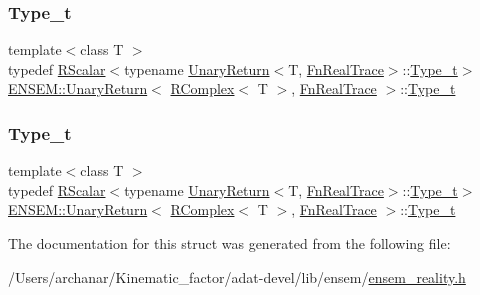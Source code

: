 \subsubsection{\texorpdfstring{Type\_t}{Type\_t}\hspace{0.1cm}{\footnotesize\ttfamily [2/3]}}
{\footnotesize\ttfamily template$<$class T $>$ \\
typedef \mbox{\hyperlink{classENSEM_1_1RScalar}{R\+Scalar}}$<$typename \mbox{\hyperlink{structENSEM_1_1UnaryReturn}{Unary\+Return}}$<$T, \mbox{\hyperlink{structENSEM_1_1FnRealTrace}{Fn\+Real\+Trace}}$>$\+::\mbox{\hyperlink{structENSEM_1_1UnaryReturn_3_01RComplex_3_01T_01_4_00_01FnRealTrace_01_4_abd4db6ffb0c49832943fdeb34185ec21}{Type\+\_\+t}}$>$ \mbox{\hyperlink{structENSEM_1_1UnaryReturn}{E\+N\+S\+E\+M\+::\+Unary\+Return}}$<$ \mbox{\hyperlink{classENSEM_1_1RComplex}{R\+Complex}}$<$ T $>$, \mbox{\hyperlink{structENSEM_1_1FnRealTrace}{Fn\+Real\+Trace}} $>$\+::\mbox{\hyperlink{structENSEM_1_1UnaryReturn_3_01RComplex_3_01T_01_4_00_01FnRealTrace_01_4_abd4db6ffb0c49832943fdeb34185ec21}{Type\+\_\+t}}}

\mbox{\label{structENSEM_1_1UnaryReturn_3_01RComplex_3_01T_01_4_00_01FnRealTrace_01_4_abd4db6ffb0c49832943fdeb34185ec21}} 
\subsubsection{\texorpdfstring{Type\_t}{Type\_t}\hspace{0.1cm}{\footnotesize\ttfamily [3/3]}}
{\footnotesize\ttfamily template$<$class T $>$ \\
typedef \mbox{\hyperlink{classENSEM_1_1RScalar}{R\+Scalar}}$<$typename \mbox{\hyperlink{structENSEM_1_1UnaryReturn}{Unary\+Return}}$<$T, \mbox{\hyperlink{structENSEM_1_1FnRealTrace}{Fn\+Real\+Trace}}$>$\+::\mbox{\hyperlink{structENSEM_1_1UnaryReturn_3_01RComplex_3_01T_01_4_00_01FnRealTrace_01_4_abd4db6ffb0c49832943fdeb34185ec21}{Type\+\_\+t}}$>$ \mbox{\hyperlink{structENSEM_1_1UnaryReturn}{E\+N\+S\+E\+M\+::\+Unary\+Return}}$<$ \mbox{\hyperlink{classENSEM_1_1RComplex}{R\+Complex}}$<$ T $>$, \mbox{\hyperlink{structENSEM_1_1FnRealTrace}{Fn\+Real\+Trace}} $>$\+::\mbox{\hyperlink{structENSEM_1_1UnaryReturn_3_01RComplex_3_01T_01_4_00_01FnRealTrace_01_4_abd4db6ffb0c49832943fdeb34185ec21}{Type\+\_\+t}}}



The documentation for this struct was generated from the following file\+:\begin{DoxyCompactItemize}
\item 
/\+Users/archanar/\+Kinematic\+\_\+factor/adat-\/devel/lib/ensem/\mbox{\hyperlink{adat-devel_2lib_2ensem_2ensem__reality_8h}{ensem\+\_\+reality.\+h}}\end{DoxyCompactItemize}
